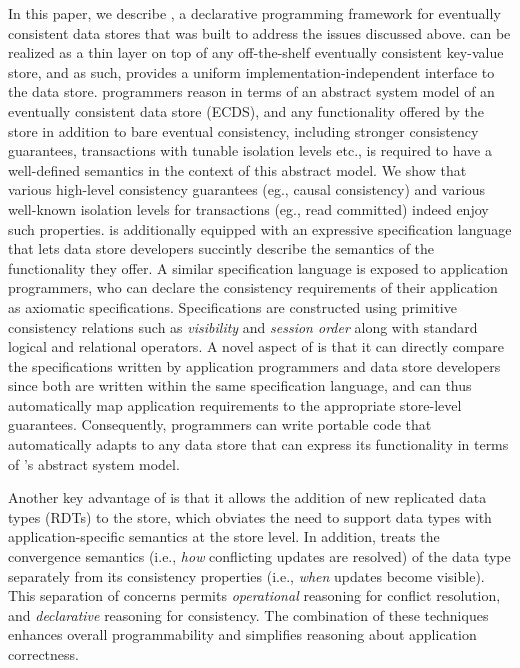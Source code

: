 In this paper, we describe \name, a declarative programming framework
for eventually consistent data stores that was built to address the
issues discussed above. \name can be realized as a thin layer on top
of any off-the-shelf eventually consistent key-value store, and as
such, provides a uniform implementation-independent interface to the
data store. \name programmers reason in terms of an abstract system
model of an eventually consistent data store (ECDS), and any
functionality offered by the store in addition to bare eventual
consistency, including stronger consistency guarantees, transactions
with tunable isolation levels etc., is required to have a well-defined
semantics in the context of this abstract model. We show that various
high-level consistency guarantees (eg., causal consistency) and
various well-known isolation levels for transactions (eg., read
committed) indeed enjoy such properties.  \name is additionally
equipped with an expressive specification language that lets data
store developers succintly describe the semantics of the functionality
they offer. A similar specification language is exposed to application
programmers, who can declare the consistency requirements of their
application as axiomatic specifications. Specifications are
constructed using primitive consistency relations such as
\emph{visibility} and \emph{session order} along with standard logical
and relational operators. A novel aspect of \name is that it can
directly compare the specifications written by application programmers
and data store developers since both are written within the same
specification language, and can thus automatically map application
requirements to the appropriate store-level guarantees. Consequently,
\name programmers can write portable code that automatically adapts to
any data store that can express its functionality in terms of \name's
abstract system model.

Another key advantage of \name is that it allows the addition of new
replicated data types (RDTs) to the store, which obviates the need to
support data types with application-specific semantics at the store
level. In addition, \name treats the convergence semantics (i.e.,
\emph{how} conflicting updates are resolved) of the data type
separately from its consistency properties (i.e., \emph{when} updates
become visible).  This separation of concerns permits
\emph{operational} reasoning for conflict resolution, and
\emph{declarative} reasoning for consistency.  The combination of
these techniques enhances overall programmability and simplifies
reasoning about application correctness.


